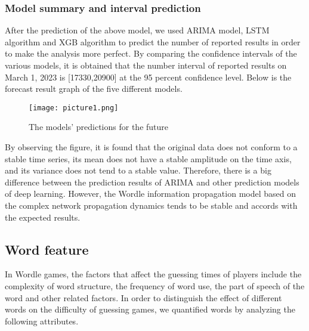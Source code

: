 \documentclass{mcmthesis}
\begin{document}
\subsubsection{Model summary and interval prediction}
After the prediction of the above model, we used ARIMA model, LSTM algorithm and XGB algorithm to predict the number of reported results in order to make the analysis more perfect. By comparing the confidence intervals of the various models, it is obtained that the number interval of reported results on March 1, 2023 is [17330,20900] at the 95 percent confidence level. Below is the forecast result graph of the five different models.
\begin{figure}[H]
	\centering
	\texttt{[image: picture1.png]}
	\caption{\small The models' predictions for the future}
\end{figure}

By observing the figure, it is found that the original data does not conform to a stable time series, its mean does not have a stable amplitude on the time axis, and its variance does not tend to a stable value. Therefore, there is a big difference between the prediction results of ARIMA and other prediction models of deep learning. However, the Wordle information propagation model based on the complex network propagation dynamics tends to be stable and accords with the expected results.

\subsection{Word feature}
In Wordle games, the factors that affect the guessing times of players include the complexity of word structure, the frequency of word use, the part of speech of the word and other related factors. In order to distinguish the effect of different words on the difficulty of guessing games, we quantified words by analyzing the following attributes.
\end{document}
